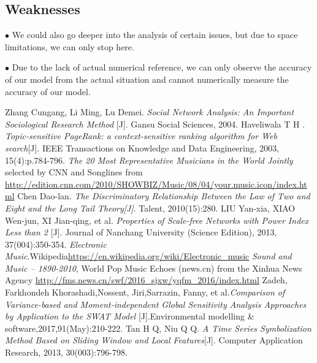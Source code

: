 \documentclass[12pt]{article}  %
\begin{document}
\vspace{-0.5cm}
\subsection{Weaknesses}
$\bullet$ We could also go deeper into the analysis of certain issues, but due to space limitations, we can only stop here.

$\bullet$ Due to the lack of actual numerical reference, we can only observe the accuracy of our model from the actual situation and cannot numerically measure the accuracy of our model.

\vspace{-0.7cm}
\begin{thebibliography}{99}
	\vspace{-0.5cm}
	 Zhang Cungang, Li Ming, Lu Demei. \emph{Social Network Analysis: An Important Sociological Research Method} [J]. Gansu Social Sciences, 2004. 
	\vspace{-0.35cm}
	 Haveliwala T H . \emph{Topic-sensitive PageRank: a context-sensitive ranking algorithm for Web search}[J]. IEEE Transactions on Knowledge and Data Engineering, 2003, 15(4):p.784-796. 
	\vspace{-0.35cm}
	 \emph{The 20 Most Representative Musicians in the World Jointly} selected by CNN and Songlines from \url{http://edition.cnn.com/2010/SHOWBIZ/Music/08/04/your.music.icon/index.html}
	\vspace{-0.35cm}
	 Chen Dao-lan. \emph{The Discriminatory Relationship Between the Law of Two and Eight and the Long Tail Theory[J]}. Talent, 2010(15):280.
	\vspace{-0.35cm}
	 LIU Yan-xia, XIAO Wen-jun, XI Jian-qing, et al. \emph{Properties of Scale-free Networks with Power Index Less than 2 }[J]. Journal of Nanchang University (Science Edition), 2013, 37(004):350-354.
	\vspace{-0.35cm}
	 \emph{Electronic Music}.Wikipedia\url{https://en.wikipedia.org/wiki/Electronic\_music}
	\vspace{-0.35cm}
	 \emph{Sound and Music -- 1890-2010}, World Pop Music Echoes (news.cn) from the Xinhua News Agency  \url{http://fms.news.cn/swf/2016_sjxw/yqfm_2016/index.html}
	\vspace{-0.35cm}
	 Zadeh, Farkhondeh Khorashadi,Nossent, Jiri,Sarrazin, Fanny, et al.\emph{Comparison of Variance-based and Moment-independent Global Sensitivity Analysis Approaches by Application to the SWAT Model} [J].Environmental modelling \& software,2017,91(May):210-222.
	\vspace{-0.35cm}
	 Tan H Q, Niu Q Q.\emph{ A Time Series Symbolization Method Based on Sliding Window and Local Features}[J]. Computer Application Research, 2013, 30(003):796-798.
\end{thebibliography}
\end{document}
